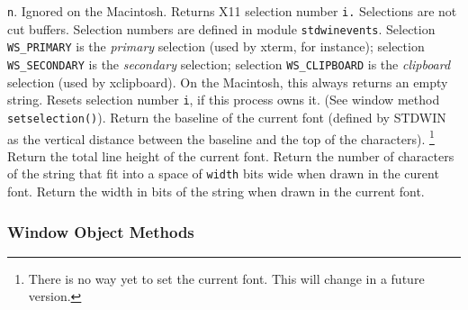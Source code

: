 \begin{description}
{\tt n}.
Ignored on the Macintosh.
Returns X11 selection number
{\tt i.}
Selections are not cut buffers.
Selection numbers are defined in module
{\tt stdwinevents}.
Selection {\tt WS\_PRIMARY} is the
{\em primary}
selection (used by
xterm,
for instance);
selection {\tt WS\_SECONDARY} is the
{\em secondary}
selection; selection {\tt WS\_CLIPBOARD} is the
{\em clipboard}
selection (used by
xclipboard).
On the Macintosh, this always returns an empty string.
Resets selection number
{\tt i},
if this process owns it.
(See window method
{\tt setselection()}).
Return the baseline of the current font (defined by STDWIN as the
vertical distance between the baseline and the top of the
characters).%
\footnote{
There is no way yet to set the current font.
This will change in a future version.
}
Return the total line height of the current font.
Return the number of characters of the string that fit into a space of
{\tt width}
bits wide when drawn in the curent font.
Return the width in bits of the string when drawn in the current font.
\end{description}

\subsubsection{Window Object Methods}

